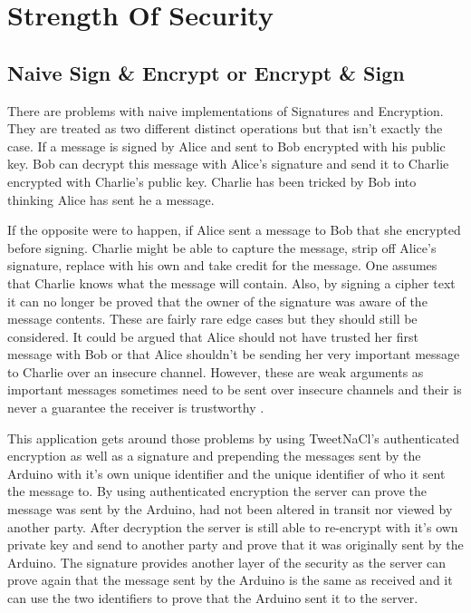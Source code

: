 
\chapter{Strength Of Security}
\label{stre}


\section{Naive Sign \& Encrypt or Encrypt \& Sign}

There are problems with naive implementations of Signatures and Encryption. They are treated as two different distinct operations but that isn't exactly the case. If a message is signed by Alice and sent to Bob encrypted with his public key. Bob can decrypt this message with Alice's signature and send it to Charlie encrypted with Charlie's public key. Charlie has been tricked by Bob into thinking Alice has sent he a message. 

If the opposite were to happen, if Alice sent a message to Bob that she encrypted before signing. Charlie might be able to capture the message, strip off Alice's signature, replace with his own and take credit for the message. One assumes that Charlie knows what the message will contain. Also, by signing a cipher text it can no longer be proved that the owner of the signature was aware of the message contents. These are fairly rare edge cases but they should still be considered. It could be argued that Alice should not have trusted her first message with Bob or that Alice shouldn't be sending her very important message to Charlie over an insecure channel. However, these are weak arguments as important messages sometimes need to be sent over insecure channels and their is never a guarantee the receiver is trustworthy \cite{signencrypt}. 

This application gets around those problems by using TweetNaCl's authenticated encryption as well as a signature and prepending the messages sent by the Arduino with it's own unique identifier and the unique identifier of who it sent the message to. By using authenticated encryption the server can prove the message was sent by the Arduino, had not been altered in transit nor viewed by another party. After decryption the server is still able to re-encrypt with it's own private key and send to another party and prove that it was originally sent by the Arduino. The signature provides another layer of the security as the server can prove again that the message sent by the Arduino is the same as received and it can use the two identifiers to prove that the Arduino sent it to the server.




